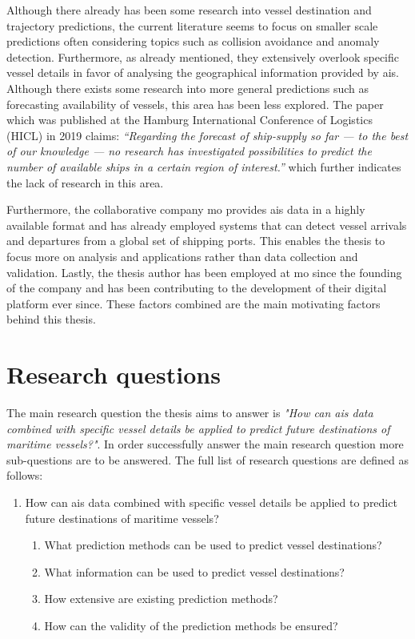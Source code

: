 Although there already has been some research into vessel destination and trajectory predictions, the current literature seems to focus on smaller scale predictions often considering topics such as collision avoidance and anomaly detection. Furthermore, as already mentioned, they extensively overlook specific vessel details in favor of analysing the geographical information provided by \acrshort{ais}. Although there exists some research into more general predictions such as forecasting availability of vessels, this area has been less explored. The paper~\cite{lechtenberg2019} which was published at the Hamburg International Conference of Logistics (HICL) in 2019 claims: \textit{“Regarding the forecast of ship-supply so far --- to the best of our knowledge --- no research has investigated possibilities to predict the number of available ships in a certain region of interest.”} which further indicates the lack of research in this area.

Furthermore, the collaborative company \acrfull{mo} provides \acrshort{ais} data in a highly available format and has already employed systems that can detect vessel arrivals and departures from a global set of shipping ports. This enables the thesis to focus more on analysis and applications rather than data collection and validation. Lastly, the thesis author has been employed at \acrshort{mo} since the founding of the company and has been contributing to the development of their digital platform ever since. These factors combined are the main motivating factors behind this thesis.

\section{Research questions}
\label{sec:research_questions}

The main research question the thesis aims to answer is \textit{"How can \acrshort{ais} data combined with specific vessel details be applied to predict future destinations of maritime vessels?"}. In order successfully answer the main research question more sub-questions are to be answered. The full list of research questions are defined as follows:

\begin{enumerate}
    \item How can \acrshort{ais} data combined with specific vessel details be applied to predict future destinations of maritime vessels?
    \begin{enumerate}
    \item What prediction methods can be used to predict vessel destinations?
    \item What information can be used to predict vessel destinations?
    \item How extensive are existing prediction methods?
    \item How can the validity of the prediction methods be ensured?
    \end{enumerate}
\end{enumerate}

